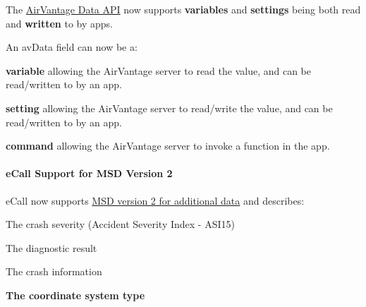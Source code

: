 The \hyperlink{c_le_avdata_le_avdata_overview}{Air\+Vantage Data A\+PI} now supports {\bfseries variables} and {\bfseries settings} being both read and {\bfseries written} to by apps.

An av\+Data field can now be a\+:
\begin{DoxyItemize}
\item {\bfseries variable} allowing the Air\+Vantage server to read the value, and can be read/written to by an app.
\item {\bfseries setting} allowing the Air\+Vantage server to read/write the value, and can be read/written to by an app.
\item {\bfseries command} allowing the Air\+Vantage server to invoke a function in the app.
\end{DoxyItemize}\hypertarget{releaseNotes18020_rn1802_Features_eCall}{}\paragraph{e\+Call Support for M\+S\+D Version 2}\label{releaseNotes18020_rn1802_Features_eCall}
e\+Call now supports \hyperlink{c_ecall_le_ecall_eraGlonassData}{M\+SD version 2 for additional data} and describes\+:
\begin{DoxyItemize}
\item The crash severity (Accident Severity Index -\/ A\+S\+I15)
\item The diagnostic result
\item The crash information
\item {\bfseries  The coordinate system type }
\end{DoxyItemize}

